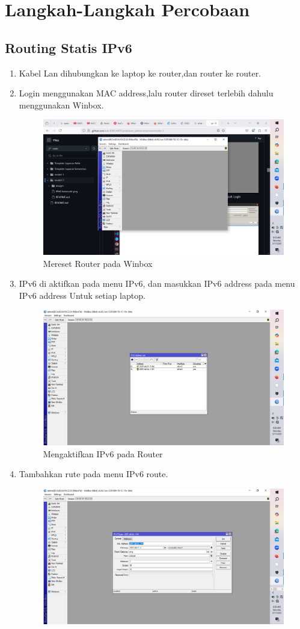 \section{Langkah-Langkah Percobaan}
\subsection{Routing Statis IPv6}
\begin{enumerate}
    \item Kabel Lan dihubungkan ke laptop ke router,dan router ke router.
    \item Login menggunakan MAC address,lalu router direset terlebih dahulu menggunakan Winbox.
    \begin{figure}[H]
        \centering
        \includegraphics[width=0.5\linewidth]{gambar1.png}
        \caption{Mereset Router pada Winbox}
        \label{fig:gambar1}
    \end{figure}
    \item IPv6 di aktifkan pada menu IPv6, dan masukkan IPv6 address pada menu IPv6 address Untuk setiap
    laptop.
    \begin{figure}[H]
        \centering
        \includegraphics[width=0.5\linewidth]{gambar2.png}
        \caption{Mengaktifkan IPv6 pada Router}
        \label{fig:gambar2}
    \end{figure}
    \item Tambahkan rute pada menu IPv6 route.
    \begin{figure}[H]
        \centering
        \includegraphics[width=0.5\linewidth]{gambar3.png}

\end{figure}
\end{enumerate}
